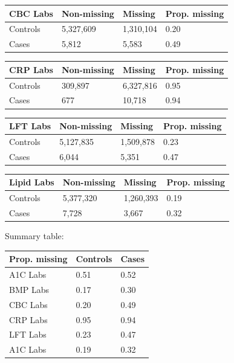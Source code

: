 \documentclass[12pt]{article}
\begin{document}
\begin{center}
\begin{tabular}{|l|l|l|l|}
\hline
\textbf{CBC Labs} & Non-missing & Missing & Prop. missing \\ \hline
Controls & 5,327,609 & 1,310,104 & 0.20 \\ \hline
Cases & 5,812 & 5,583 & 0.49 \\ \hline
\end{tabular}
\end{center}

\begin{center}
\begin{tabular}{|l|l|l|l|}
\hline
\textbf{CRP Labs} & Non-missing & Missing & Prop. missing \\ \hline
Controls & 309,897 & 6,327,816 & 0.95 \\ \hline
Cases & 677 & 10,718 & 0.94 \\ \hline
\end{tabular}
\end{center}

\begin{center}
\begin{tabular}{|l|l|l|l|}
\hline
\textbf{LFT Labs} & Non-missing & Missing & Prop. missing \\ \hline
Controls & 5,127,835 & 1,509,878 & 0.23 \\ \hline
Cases & 6,044 & 5,351 & 0.47 \\ \hline
\end{tabular}
\end{center}

\begin{center}
\begin{tabular}{|l|l|l|l|}
\hline
\textbf{Lipid Labs} & Non-missing & Missing & Prop. missing \\ \hline
Controls & 5,377,320 & 1,260,393 & 0.19 \\ \hline
Cases & 7,728 & 3,667 & 0.32 \\ \hline
\end{tabular}
\end{center}

Summary table:
\begin{center}
\begin{tabular}{|l|l|l|}
\hline
\textbf{Prop. missing} & Controls & Cases \\ \hline
A1C Labs & 0.51 & 0.52 \\ \hline
BMP Labs & 0.17 & 0.30 \\ \hline
CBC Labs & 0.20 & 0.49 \\ \hline
CRP Labs & 0.95 & 0.94 \\ \hline
LFT Labs & 0.23 & 0.47 \\ \hline
A1C Labs & 0.19 & 0.32 \\ \hline
\end{tabular}
\end{center}
\end{document}
